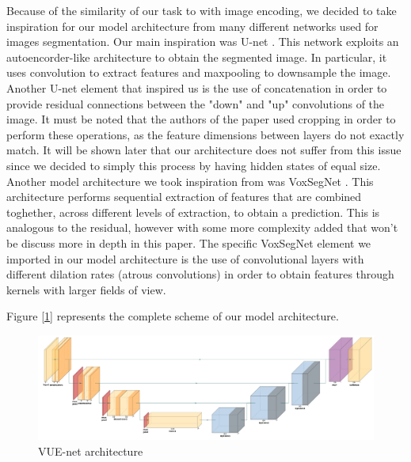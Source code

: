 Because of the similarity of our task to with image encoding, we decided to take inspiration for our model architecture
from many different networks used for images segmentation. Our main inspiration was U-net \cite{Unet}.
This network exploits an autoencorder-like architecture to obtain the segmented image.
In particular, it uses convolution to extract features and maxpooling to downsample the image.
Another U-net element that inspired us is the use of concatenation in order to provide
residual connections between the "down" and "up" convolutions of the image. It must be noted that
the authors of the paper used cropping in order to perform these operations, as the feature dimensions between layers do not exactly match. 
It will be shown later that our architecture does not suffer from this issue since we decided to simply 
this process by having hidden states of equal size.
Another model architecture we took inspiration from was VoxSegNet \cite{VoxSegNet}. This architecture performs 
sequential extraction of features that are combined toghether, across different levels of extraction, to obtain a prediction. 
This is analogous to the residual, however with some more complexity added that won't be
discuss more in depth in this paper. 
The specific VoxSegNet element we imported in our model architecture is the use of convolutional layers with different dilation rates 
(atrous convolutions) in order to obtain features through kernels with larger fields of view.

Figure [\ref{fig:model}] represents the complete scheme of our model architecture.
\begin{figure}[ht]
    \centering
    \includegraphics[width=\textwidth]{images/VUE_net_model.png}
    \caption{VUE-net architecture}
    \label{fig:model}
  \end{figure}
